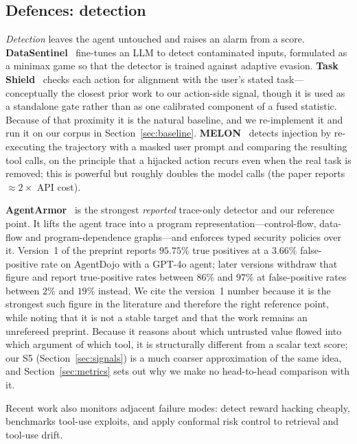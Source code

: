\documentclass[preprint,12pt,number]{elsarticle}
\theoremstyle{definition}
\begin{document}
\subsection{Defences: detection}

\emph{Detection} leaves the agent untouched and raises an alarm from a score.
\textbf{DataSentinel}~\citep{liu2025datasentinel} fine-tunes an LLM to detect
contaminated inputs, formulated as a minimax game so that the detector is trained
against adaptive evasion. \textbf{Task Shield}~\citep{jia2024taskshield} checks
each action for alignment with the user's stated task---conceptually the closest
prior work to our action-side signal, though it is used as a standalone gate
rather than as one calibrated component of a fused statistic. Because of that
proximity it is the natural baseline, and we re-implement it and run it on our
corpus in Section~\ref{sec:baseline}.
\textbf{MELON}~\citep{zhu2025melon} detects injection by re-executing the
trajectory with a masked user prompt and comparing the resulting tool calls, on
the principle that a hijacked action recurs even when the real task is removed;
this is powerful but roughly doubles the model calls (the paper reports
$\approx 2\times$ API cost).

\textbf{AgentArmor}~\citep{wang2025agentarmor} is the strongest \emph{reported}
trace-only detector and our reference point. It lifts the agent trace into a
program representation---control-flow, data-flow and program-dependence
graphs---and enforces typed security policies over it. Version~1 of the preprint
reports $95.75\%$ true positives at a $3.66\%$ false-positive rate on AgentDojo
with a GPT-4o agent; later versions withdraw that figure and report true-positive
rates between $86\%$ and $97\%$ at false-positive rates between $2\%$ and $19\%$
instead. We cite the version~1 number because it is the strongest such figure in
the literature and therefore the right reference point, while noting that it is
not a stable target and that the work remains an unrefereed preprint. Because it
reasons about which untrusted value flowed into which argument of which tool, it is
structurally different from a scalar text score; our S5 (Section~\ref{sec:signals})
is a much coarser approximation of the same idea, and Section~\ref{sec:metrics}
sets out why we make no head-to-head comparison with it.

Recent work also monitors adjacent failure modes: \citet{belenky2026cheap} detect
reward hacking cheaply, \citet{thaman2026rewardhacking} benchmarks tool-use
exploits, and \citet{opoku2026toolchain} apply conformal risk control to
retrieval and tool-use drift.
\end{document}
